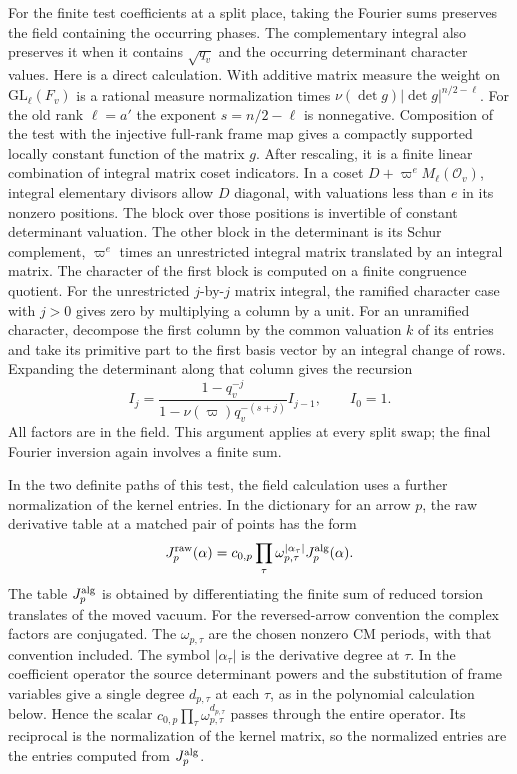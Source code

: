 For the finite test coefficients at a split place, taking the
Fourier sums preserves the field containing the occurring phases.
The complementary integral also preserves it when it contains
\(\sqrt{q_v}\) and the occurring determinant character values.
Here is a direct calculation. With additive matrix measure the
weight on \(\mathrm{GL}_\ell(F_v)\) is a rational measure
normalization times \(\nu(\det g)|\det g|^{n/2-\ell}\).
For the old rank \(\ell=a'\) the exponent \(s=n/2-\ell\) is
nonnegative. Composition of the test with the injective
full-rank frame map gives a compactly supported locally constant
function of the matrix \(g\). After rescaling, it is a finite
linear combination of integral matrix coset indicators.
In a coset \(D+\varpi^e M_\ell(\mathcal O_v)\), integral
elementary divisors allow \(D\) diagonal, with valuations
less than \(e\) in its nonzero positions. The block over those
positions is invertible of constant determinant valuation.
The other block in the determinant is its Schur complement,
\(\varpi^e\) times an unrestricted integral matrix translated
by an integral matrix. The character of the first block is
computed on a finite congruence quotient.
For the unrestricted \(j\)-by-\(j\) matrix integral, the ramified
character case with \(j>0\) gives zero by multiplying a column
by a unit. For an unramified character, decompose the first
column by the common valuation \(k\) of its entries and take
its primitive part to the first basis vector by an integral
change of rows. Expanding the determinant along that column
gives the recursion
\[
 I_j=\frac{1-q_v^{-j}}{1-\nu(\varpi)q_v^{-(s+j)}}I_{j-1},
 \qquad I_0=1.
\]
All factors are in the field. This argument applies at every
split swap; the final Fourier inversion again involves a
finite sum.

In the two definite paths of this test, the field calculation
uses a further normalization of the kernel entries. In the
dictionary for an arrow \(p\), the raw derivative table at a
matched pair of points has the form
\[
 J^{\rm raw}_p(\alpha)
   =c_{0,p}\prod_{\tau}\omega_{p,\tau}^{|\alpha_\tau|}
                  J^{\rm alg}_p(\alpha).
\]
The table \(J^{\rm alg}_p\) is obtained by differentiating the
finite sum of reduced torsion translates of the moved vacuum.
For the reversed-arrow convention the complex factors are
conjugated. The \(\omega_{p,\tau}\) are the chosen nonzero
CM periods, with that convention included. The symbol
\(|\alpha_\tau|\) is the derivative degree at \(\tau\).
In the coefficient operator the source determinant powers
and the substitution of frame variables give a single degree
\(d_{p,\tau}\) at each \(\tau\), as in the polynomial
calculation below. Hence the scalar
\(c_{0,p}\prod_\tau\omega_{p,\tau}^{d_{p,\tau}}\)
passes through the entire operator. Its reciprocal is the
normalization of the kernel matrix, so the normalized entries
are the entries computed from \(J^{\rm alg}_p\).
